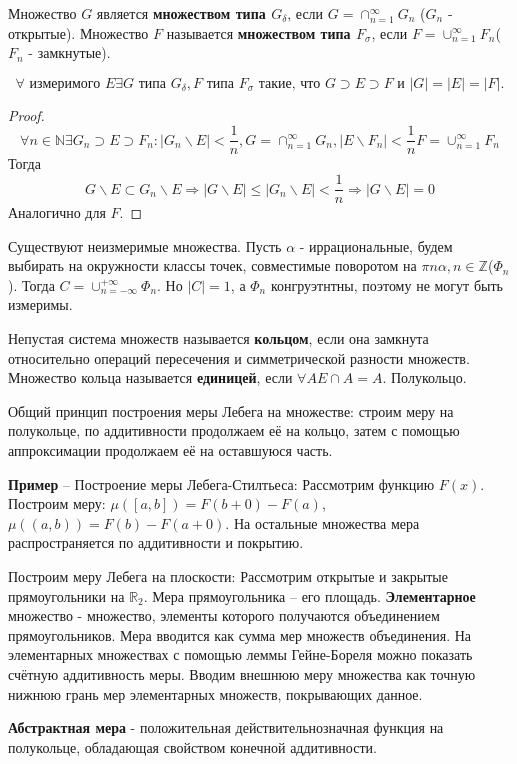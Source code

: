 \documentclass[11pt]{article}
\newcounter{th}\setcounter{th}{0}
\def\th{\par\smallskip\refstepcounter{th}\textbf{\arabic{th}}}
\newtheorem*{Theorem}{Теорема \th}
\begin{document}
Множество $G$ является \textbf{множеством типа $G_\delta$}, если $G = \cap_{n = 1}^{\infty}G_n$
($G_n$ - открытые). Множество $F$ называется \textbf{множеством типа $F_\sigma$}, если
$F = \cup_{n = 1}^{\infty}F_n$($F_n$ - замкнутые).
\begin{Theorem}
\begin{equation*}
\forall \text{ измеримого } E \exists G\text{ типа }G_{\delta}, F\text{ типа }F_{\sigma} \text{ такие,
что } G \supset E \supset F \text{ и } |G| = |E| = |F|.
\end{equation*}
\end{Theorem}
\begin{proof}
\begin{equation*}
\forall n \in \mathbb{N} \exists G_n \supset E \supset F_n: |G_n \backslash E| < \frac1n,
G = \cap_{n = 1}^{\infty}G_n, |E \backslash F_n| < \frac1n F = \cup_{n = 1}^{\infty}F_n
\end{equation*}
Тогда
\begin{equation*}
G \backslash E \subset G_n \backslash E \Rightarrow |G \backslash E| \leq |G_n \backslash E| < \frac1n
\Rightarrow |G \backslash E| = 0
\end{equation*}
Аналогично для $F$.
\end{proof}
Существуют неизмеримые множества. Пусть $\alpha$ - иррациональные, будем выбирать на
окружности классы точек, совместимые поворотом на $\pi n\alpha, n \in \mathbb{Z}$($\Phi_n$). Тогда
$C = \cup_{n = -\infty}^{+\infty}\Phi_n$. Но $|C| = 1$, а $\Phi_n$ конгруэтнтны, поэтому не могут
быть измеримы.

Непустая система множеств называется \textbf{кольцом}, если она замкнута относительно операций
пересечения и симметрической разности множеств. Множество кольца называется \textbf{единицей},
если $\forall A E\cap A = A$. Полукольцо.

Общий принцип построения меры Лебега на множестве: строим меру на полукольце, по аддитивности
продолжаем её на кольцо, затем с помощью аппроксимации продолжаем её на оставшуюся часть.

\textbf{Пример} -- Построение меры Лебега-Стилтьеса:
Рассмотрим функцию $F(x)$. Построим меру: $\mu([a, b]) = F(b + 0) - F(a)$, $\mu((a, b)) = F(b) - F(a + 0)$.
На остальные множества мера распространяется по аддитивности и покрытию.

Построим меру Лебега на плоскости:
Рассмотрим открытые и закрытые прямоугольники на $\mathbb{R}_2$. Мера прямоугольника -- его площадь.
\textbf{Элементарное} множество - множество, элементы которого получаются объединением
прямоугольников. Мера вводится как сумма мер множеств объединения. На элементарных множествах
с помощью леммы Гейне-Бореля можно показать счётную аддитивность меры. Вводим внешнюю меру
множества как точную нижнюю грань мер элементарных множеств, покрывающих данное.

\textbf{Абстрактная мера} - положительная действительнозначная функция на полукольце,
обладающая свойством конечной аддитивности.
\end{document}
